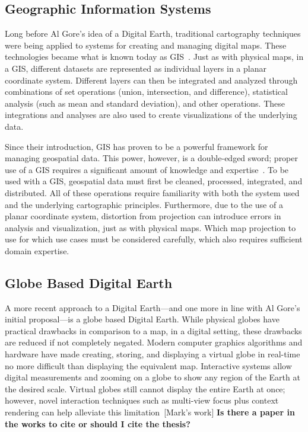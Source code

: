 \subsection{Geographic Information Systems}
Long before Al Gore's idea of a Digital Earth, traditional cartography techniques were being applied to systems for creating and managing digital maps.
These technologies became what is known today as GIS~\cite{foresman1998history}.
Just as with physical maps, in a GIS, different datasets are represented as individual layers in a planar coordinate system.
Different layers can then be integrated and analyzed through combinations of set operations (union, intersection, and difference), statistical analysis (such as mean and standard deviation), and other operations.
These integrations and analyses are also used to create visualizations of the underlying data.


Since their introduction, GIS has proven to be a powerful framework for managing geospatial data.
This power, however, is a double-edged sword; proper use of a GIS requires a significant amount of knowledge and expertise~\cite{antenucci1991geographic}.
To be used with a GIS, geospatial data must first be cleaned, processed, integrated, and distributed.
All of these operations require familiarity with both the system used and the underlying cartographic principles.
Furthermore, due to the use of a planar coordinate system, distortion from projection can introduce errors in analysis and visualization, just as with physical maps.
Which map projection to use for which use cases must be considered carefully, which also requires sufficient domain expertise.


\subsection{Globe Based Digital Earth}
A more recent approach to a Digital Earth---and one more in line with Al Gore's initial proposal---is a globe based Digital Earth.
While physical globes have practical drawbacks in comparison to a map, in a digital setting, these drawbacks are reduced if not completely negated. 
Modern computer graphics algorithms and hardware have made creating, storing, and displaying a virtual globe in real-time no more difficult than displaying the equivalent map.
Interactive systems allow digital measurements and zooming on a globe to show any region of the Earth at the desired scale.
Virtual globes still cannot display the entire Earth at once; however, novel interaction techniques such as multi-view focus plus context rendering can help alleviate this limitation~[Mark's work] \textbf{Is there a paper in the works to cite or should I cite the thesis?}%


